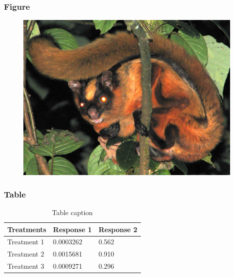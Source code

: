 \documentclass[12pt]{beamer}\usepackage[]{graphicx}\usepackage[]{color}
\begin{document}
\begin{frame}
\frametitle{Figure}
\begin{figure}
   \includegraphics[width=1.0\linewidth]{Petaurista_nobilis_2.jpg}
\end{figure}
\end{frame}

\begin{frame}
\frametitle{Table}
\begin{table}
\begin{tabular}{l l l}
\toprule
\textbf{Treatments} & \textbf{Response 1} & \textbf{Response 2}\\
\midrule
Treatment 1 & 0.0003262 & 0.562 \\
Treatment 2 & 0.0015681 & 0.910 \\
Treatment 3 & 0.0009271 & 0.296 \\
\bottomrule
\end{tabular}
\caption{Table caption}
\end{table}
\end{frame}

\end{document}

